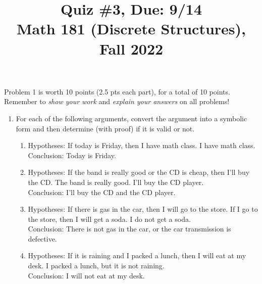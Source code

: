 \documentclass[11pt]{article}
\title{Quiz \#3, Due: 9/14 \\Math 181 (Discrete Structures), Fall 2022}
\date{}
\begin{document}
\maketitle

\thispagestyle{empty}

\vspace{-1cm}

Problem 1 is worth 10 points (2.5 pts each part), for a total of 10 points. Remember to \emph{show your work} and \emph{explain your answers} on all problems!

\begin{enumerate}
\item For each of the following arguments, convert the argument into a symbolic form and then determine (with proof) if it is valid or not.
\begin{enumerate}
\item Hypotheses: If today is Friday, then I have math class. I have math class. \\ Conclusion: Today is Friday.
\item Hypotheses: If the band is really good or the CD is cheap, then I'll buy the CD. The band is really good. I'll buy the CD player. \\ Conclusion: I'll buy the CD and the CD player.
\item Hypotheses: If there is gas in the car, then I will go to the store. If I go to the store, then I will get a soda. I do not get a soda. \\ Conclusion: There is not gas in the car, or the car transmission is defective.
\item Hypotheses: If it is raining and I packed a lunch, then I will eat at my desk. I packed a lunch, but it is not raining. \\ Conclusion: I will not eat at my desk.
\end{enumerate}
\end{enumerate}
\end{document}

